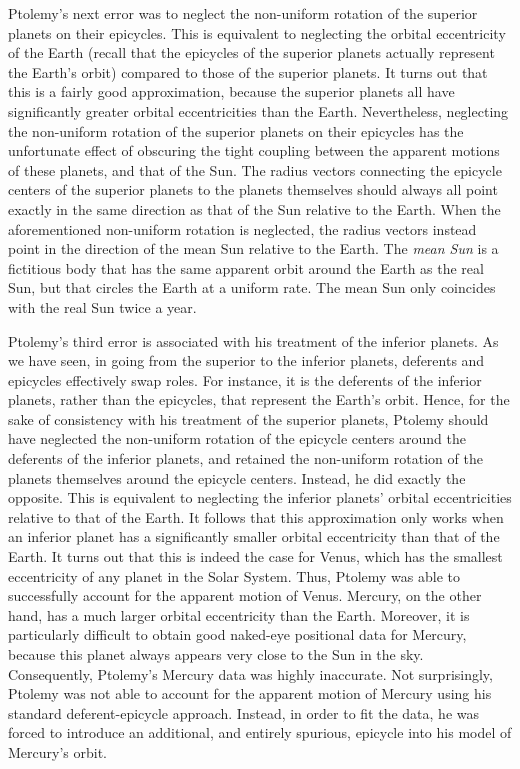 Ptolemy's next error was to neglect the non-uniform rotation of the
superior planets on their epicycles. This is equivalent to neglecting
the orbital eccentricity of the Earth (recall that the epicycles of the superior
planets actually represent the Earth's orbit) compared to those of
the superior planets. It turns out that this is a fairly good approximation,
because the superior planets all have significantly greater orbital eccentricities
than the Earth. Nevertheless, 
neglecting  the non-uniform rotation of the
superior planets on their epicycles has the unfortunate effect of obscuring the tight coupling between
the apparent motions of these planets, and that of the Sun. The radius vectors connecting the epicycle centers of the
superior planets to the planets themselves should always all point  exactly in the
same direction as that of the Sun relative to the Earth.
When the aforementioned non-uniform rotation is neglected, the radius
vectors instead point in the direction of the  mean Sun  relative to
the Earth. The {\em mean Sun}\/ is a fictitious body that has the
same apparent orbit around the Earth as the real Sun, but that circles
the Earth at a uniform rate. The mean Sun only coincides with the
real Sun twice a year.

Ptolemy's third error is associated with his treatment of the
inferior planets. As we have seen, in going from the superior to the
inferior planets, deferents and epicycles effectively swap roles. 
For instance, it is the deferents  of the inferior planets, rather than the epicycles, that represent
the Earth's orbit. Hence, for the sake of consistency with his treatment of
the superior planets, Ptolemy should have neglected the non-uniform
rotation of the epicycle centers around the deferents of the inferior
planets, and retained the non-uniform rotation of the planets themselves around the
epicycle centers. Instead, he did exactly the opposite. This
is equivalent to neglecting the inferior planets' orbital eccentricities relative to
that of the Earth. It follows that this approximation only works when an inferior
planet has a significantly smaller  orbital eccentricity than that of the Earth.
It turns out that this is indeed the case for Venus, which has the smallest eccentricity
of any planet in the Solar System. Thus, Ptolemy was able to
successfully account for the apparent motion of Venus. Mercury, on the
other hand, has a much larger orbital eccentricity than the Earth. Moreover, it
is particularly difficult to obtain good naked-eye positional data for Mercury, because this planet always appears 
very close to the Sun in the sky. Consequently,
Ptolemy's Mercury data was highly inaccurate.
 Not surprisingly, Ptolemy was not able to account for the apparent motion of Mercury
using his standard deferent-epicycle approach. Instead, in order to fit the data, he was forced
to introduce an additional, and entirely spurious, epicycle into his  model of
Mercury's orbit.

